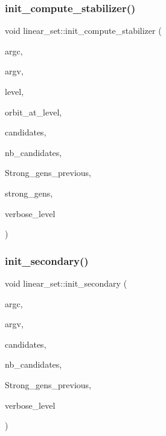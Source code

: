 \subsubsection{\texorpdfstring{init\+\_\+compute\+\_\+stabilizer()}{init\_compute\_stabilizer()}}
{\footnotesize\ttfamily void linear\+\_\+set\+::init\+\_\+compute\+\_\+stabilizer (\begin{DoxyParamCaption}\item[{int}]{argc,  }\item[{const char $\ast$$\ast$}]{argv,  }\item[{\mbox{\hyperlink{galois_8h_a09fddde158a3a20bd2dcadb609de11dc}{I\+NT}}}]{level,  }\item[{\mbox{\hyperlink{galois_8h_a09fddde158a3a20bd2dcadb609de11dc}{I\+NT}}}]{orbit\+\_\+at\+\_\+level,  }\item[{\mbox{\hyperlink{galois_8h_a09fddde158a3a20bd2dcadb609de11dc}{I\+NT}} $\ast$}]{candidates,  }\item[{\mbox{\hyperlink{galois_8h_a09fddde158a3a20bd2dcadb609de11dc}{I\+NT}}}]{nb\+\_\+candidates,  }\item[{\mbox{\hyperlink{classstrong__generators}{strong\+\_\+generators}} $\ast$}]{Strong\+\_\+gens\+\_\+previous,  }\item[{\mbox{\hyperlink{classstrong__generators}{strong\+\_\+generators}} $\ast$\&}]{strong\+\_\+gens,  }\item[{\mbox{\hyperlink{galois_8h_a09fddde158a3a20bd2dcadb609de11dc}{I\+NT}}}]{verbose\+\_\+level }\end{DoxyParamCaption})}

\mbox{\label{classlinear__set_a7bf8cd7805559b5762921687a7c1ed97}} 
\subsubsection{\texorpdfstring{init\+\_\+secondary()}{init\_secondary()}}
{\footnotesize\ttfamily void linear\+\_\+set\+::init\+\_\+secondary (\begin{DoxyParamCaption}\item[{int}]{argc,  }\item[{const char $\ast$$\ast$}]{argv,  }\item[{\mbox{\hyperlink{galois_8h_a09fddde158a3a20bd2dcadb609de11dc}{I\+NT}} $\ast$}]{candidates,  }\item[{\mbox{\hyperlink{galois_8h_a09fddde158a3a20bd2dcadb609de11dc}{I\+NT}}}]{nb\+\_\+candidates,  }\item[{\mbox{\hyperlink{classstrong__generators}{strong\+\_\+generators}} $\ast$}]{Strong\+\_\+gens\+\_\+previous,  }\item[{\mbox{\hyperlink{galois_8h_a09fddde158a3a20bd2dcadb609de11dc}{I\+NT}}}]{verbose\+\_\+level }\end{DoxyParamCaption})}

